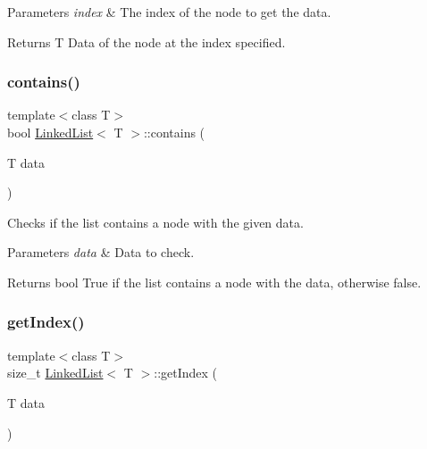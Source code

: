 \begin{DoxyParams}{Parameters}
{\em index} & The index of the node to get the data. \\
\hline
\end{DoxyParams}
\begin{DoxyReturn}{Returns}
T Data of the node at the index specified. 
\end{DoxyReturn}
\mbox{\label{classLinkedList_a603e1c5a0a4528d82f83b9393f83bf22}} 
\subsubsection{\texorpdfstring{contains()}{contains()}}
{\footnotesize\ttfamily template$<$class T$>$ \\
bool \hyperlink{classLinkedList}{Linked\+List}$<$ T $>$\+::contains (\begin{DoxyParamCaption}\item[{T}]{data }\end{DoxyParamCaption})\hspace{0.3cm}{\ttfamily [inline]}}



Checks if the list contains a node with the given data. 


\begin{DoxyParams}{Parameters}
{\em data} & Data to check. \\
\hline
\end{DoxyParams}
\begin{DoxyReturn}{Returns}
bool True if the list contains a node with the data, otherwise false. 
\end{DoxyReturn}
\mbox{\label{classLinkedList_ac274901e769cff00d61b52844e96b21e}} 
\subsubsection{\texorpdfstring{get\+Index()}{getIndex()}}
{\footnotesize\ttfamily template$<$class T$>$ \\
size\+\_\+t \hyperlink{classLinkedList}{Linked\+List}$<$ T $>$\+::get\+Index (\begin{DoxyParamCaption}\item[{T}]{data }\end{DoxyParamCaption})\hspace{0.3cm}{\ttfamily [inline]}}



